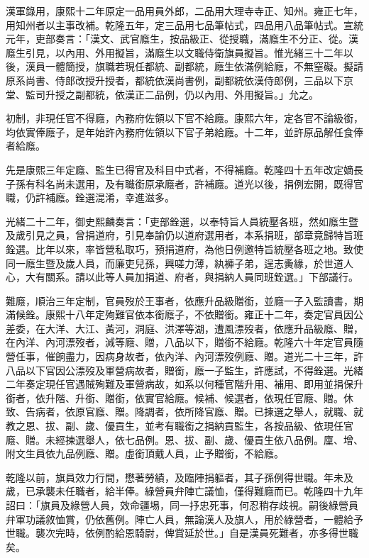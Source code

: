 \begin{pinyinscope}
漢軍錄用，康熙十二年原定一品用員外郎，二品用大理寺寺正、知州。雍正七年，用知州者以主事改補。乾隆五年，定三品用七品筆帖式，四品用八品筆帖式。宣統元年，吏部奏言：「漢文、武官廕生，按品級正、從授職，滿廕生不分正、從。漢廕生引見，以內用、外用擬旨，滿廕生以文職侍衛旗員擬旨。惟光緒三十二年以後，漢員一體簡授，旗職若現任都統、副都統，廕生依滿例給廕，不無窒礙。擬請原系尚書、侍郎改授升授者，都統依漢尚書例，副都統依漢侍郎例，三品以下京堂、監司升授之副都統，依漢正二品例，仍以內用、外用擬旨。」允之。

初制，非現任官不得廕，內務府佐領以下官不給廕。康熙六年，定各官不論級銜，均依實俸廕子，是年始許內務府佐領以下官子弟給廕。十二年，並許原品解任食俸者給廕。

先是康熙三年定廕、監生已得官及科目中式者，不得補廕。乾隆四十五年改定嫡長子孫有科名尚未選用，及有職銜原承廕者，許補廕。道光以後，捐例宏開，既得官職，仍許補廕。銓選混淆，幸進滋多。

光緒二十二年，御史熙麟奏言：「吏部銓選，以奉特旨人員統壓各班，然如廕生暨及歲引見之員，曾捐道府，引見奉諭仍以道府選用者，本系捐班，部章竟歸特旨班銓選。比年以來，率皆營私取巧，預捐道府，為他日例邀特旨統壓各班之地。致使同一廕生暨及歲人員，而廉吏兒孫，興嗟力薄，紈褲子弟，逞志夤緣，於世道人心，大有關系。請以此等人員加捐道、府者，與捐納人員同班銓選。」下部議行。

難廕，順治三年定制，官員歿於王事者，依應升品級贈銜，並廕一子入監讀書，期滿候銓。康熙十八年定殉難官依本銜廕子，不依贈銜。雍正十二年，奏定官員因公差委，在大洋、大江、黃河，洞庭、洪澤等湖，遭風漂歿者，依應升品級廕、贈，在內洋、內河漂歿者，減等廕、贈，八品以下，贈銜不給廕。乾隆六十年定官員隨營任事，催餉盡力，因病身故者，依內洋、內河漂歿例廕、贈。道光二十三年，許八品以下官因公漂歿及軍營病故者，贈銜，廕一子監生，許應試，不得銓選。光緒二年奏定現任官遇賊殉難及軍營病故，如系以何種官階升用、補用、即用並捐保升銜者，依升階、升銜、贈銜，依實官給廕。候補、候選者，依現任官廕、贈。休致、告病者，依原官廕、贈。降調者，依所降官廕、贈。已揀選之舉人，就職、就教之恩、拔、副、歲、優貢生，並考有職銜之捐納貢監生，各按品級、依現任官廕、贈。未經揀選舉人，依七品例。恩、拔、副、歲、優貢生依八品例。廩、增、附文生員依九品例廕、贈。虛銜頂戴人員，止予贈銜，不給廕。

乾隆以前，旗員效力行間，懋著勞績，及臨陣捐軀者，其子孫例得世職。年未及歲，已承襲未任職者，給半俸。綠營員弁陣亡議恤，僅得難廕而已。乾隆四十九年詔曰：「旗員及綠營人員，效命疆埸，同一抒忠死事，何忍稍存歧視。嗣後綠營員弁軍功議敘恤賞，仍依舊例。陣亡人員，無論漢人及旗人，用於綠營者，一體給予世職。襲次完時，依例酌給恩騎尉，俾賞延於世。」自是漢員死難者，亦多得世職矣。


\end{pinyinscope}
